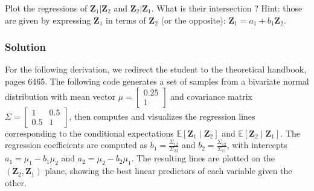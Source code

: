\documentclass[letterpaper,10pt,english]{jupyterBook}
\begin{document}
\sphinxAtStartPar
Plot the regressions of \(\mathbf Z_1|\mathbf Z_2\) and \(\mathbf Z_2|\mathbf Z_1\). What is their intersection ? Hint: those are given by expressing \(\mathbf Z_1\) in terms of \(\mathbf Z_2\) (or the opposite): \(\mathbf Z_1 = a_1 + b_1\mathbf Z_2\).


\subsubsection{Solution}
\label{\detokenize{01:id9}}
\sphinxAtStartPar
For the following derivation, we redirect the student to the theoretical handbook, pages 64\sphinxhyphen{}65. The following code generates a set of samples from a bivariate normal distribution with mean vector \(\mu = \begin{bmatrix} 0.25 \\ 1 \end{bmatrix}\) and covariance matrix \(\Sigma = \begin{bmatrix} 1 & 0.5 \\ 0.5 & 1 \end{bmatrix}\), then computes and visualizes the regression lines corresponding to the conditional expectations \(\mathbb{E}[\mathbf Z_1 \mid \mathbf Z_2]\) and \(\mathbb{E}[\mathbf Z_2 \mid \mathbf Z_1]\). The regression coefficients are computed as \(b_1 = \frac{\Sigma_{12}}{\Sigma_{22}}\) and \(b_2 = \frac{\Sigma_{12}}{\Sigma_{11}}\), with intercepts \(a_1 = \mu_1 - b_1 \mu_2\) and \(a_2 = \mu_2 - b_2 \mu_1\). The resulting lines are plotted on the \((\mathbf Z_2, \mathbf Z_1)\) plane, showing the best linear predictors of each variable given the other.
\end{document}
